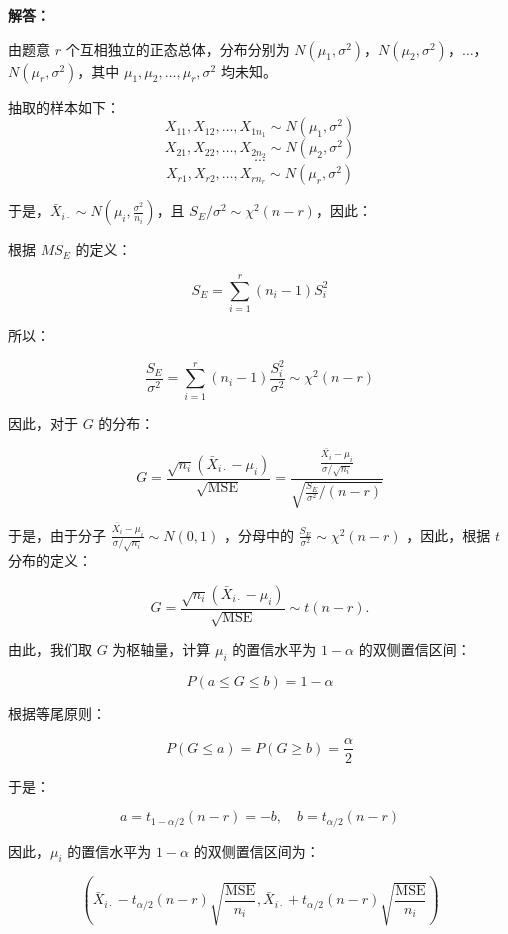 \documentclass[12pt,a4paper]{article}
\begin{document}
\begin{answerbox}
\textbf{解答：}

由题意 $r$ 个互相独立的正态总体，分布分别为 $N(\mu_1,\sigma^2)$，$N(\mu_2,\sigma^2)$，$\ldots$，$N(\mu_r,\sigma^2)$，其中 $\mu_1,\mu_2,\ldots,\mu_r,\sigma^2$ 均未知。

抽取的样本如下：
\[
X_{11},X_{12},\ldots,X_{1n_1} \sim N(\mu_1,\sigma^2)
\]
\[
X_{21},X_{22},\ldots,X_{2n_2} \sim N(\mu_2,\sigma^2)
\]
\[
\cdots
\]
\[
X_{r1},X_{r2},\ldots,X_{rn_r} \sim N(\mu_r,\sigma^2)
\]

于是，$\bar{X}_{i\cdot} \sim N\left(\mu_i, \frac{\sigma^2}{n_i}\right)$，且 $S_E/\sigma^2 \sim \chi^2(n-r)$，因此：

根据 $MS_E$ 的定义：

$$
S_E = \sum_{i=1}^r (n_i - 1) S_i^2
$$

所以：

$$
\frac{S_E}{\sigma^2} = \sum_{i=1}^r (n_i - 1) \frac{S_i^2}{\sigma^2} \sim \chi^2(n-r) 
$$

因此，对于 $G$ 的分布：

$$
G=\frac{\sqrt{n_i}(\bar X_{i\cdot}-\mu_i)}{\sqrt{\mathrm{MSE}}} = \frac{\frac{\bar{X_i}-\mu_i}{\sigma/\sqrt{n_i}}}{\sqrt{\frac{S_E}{\sigma^2}/(n-r)}}
$$

于是，由于分子 $\frac{\bar{X_i}-\mu_i}{\sigma/\sqrt{n_i}} \sim N(0,1)$ ，分母中的 $\frac{S_E}{\sigma^2} \sim \chi^2(n-r)$ ，因此，根据 $t$ 分布的定义：

$$
G=\frac{\sqrt{n_i}(\bar X_{i\cdot}-\mu_i)}{\sqrt{\mathrm{MSE}}} \sim t(n-r).
$$

由此，我们取 $G$ 为枢轴量，计算 $\mu_i$ 的置信水平为 $1-\alpha$ 的双侧置信区间：

$$
P\left(a \leq G \leq b\right) = 1-\alpha
$$

根据等尾原则：

$$
P\left(G \leq a\right) = P\left(G \geq b\right) = \frac{\alpha}{2}
$$

于是：

$$
a = t_{1-\alpha/2}(n-r) = -b, \quad b = t_{\alpha/2}(n-r)
$$

因此，$\mu_i$ 的置信水平为 $1-\alpha$ 的双侧置信区间为：

$$
\left( \bar{X}_{i\cdot} - t_{\alpha/2}(n-r) \sqrt{\frac{\mathrm{MSE}}{n_i}}, \bar{X}_{i\cdot} + t_{\alpha/2}(n-r)\sqrt{\frac{\mathrm{MSE}}{n_i}} \right)
$$

\end{answerbox}
\end{document}
